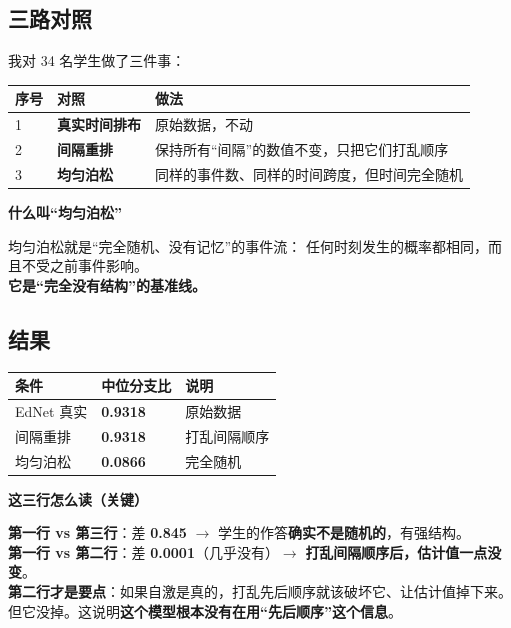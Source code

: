 \documentclass[UTF8,a4paper,11pt]{ctexart}
\newenvironment{explainbox}[1]
{\begin{center}\begin{minipage}{0.94\textwidth}\colorbox{boxbg}{\parbox{0.92\textwidth}{\textbf{#1}\par\vspace{2pt}}}}
{\end{minipage}\end{center}}
\newcommand{\hl}[1]{\textcolor{blue!70!black}{\textbf{#1}}}
\newcommand{\warn}[1]{\textcolor{red!70!black}{\textbf{#1}}}
\begin{document}
\subsection{三路对照}

我对 34 名学生做了三件事：

\begin{longtable}{@{}p{0.8cm}p{3.6cm}p{9.4cm}@{}}
\toprule
\textbf{序号} & \textbf{对照} & \textbf{做法} \\
\midrule
1 & \textbf{真实时间排布} & 原始数据，不动 \\
2 & \textbf{间隔重排} & 保持所有“间隔”的数值不变，只把它们打乱顺序 \\
3 & \textbf{均匀泊松} & 同样的事件数、同样的时间跨度，但时间完全随机 \\
\bottomrule
\end{longtable}

\begin{explainbox}{什么叫“均匀泊松”}
均匀泊松就是“完全随机、没有记忆”的事件流：
任何时刻发生的概率都相同，而且不受之前事件影响。\\
\textbf{它是“完全没有结构”的基准线。}
\end{explainbox}

\subsection{结果}

\begin{center}
\begin{tabular}{p{5.0cm}p{3.4cm}p{4.8cm}}
\toprule
\textbf{条件} & \textbf{中位分支比} & \textbf{说明} \\
\midrule
EdNet 真实 & \textbf{0.9318} & 原始数据 \\
间隔重排 & \textbf{0.9318} & 打乱间隔顺序 \\
均匀泊松 & \textbf{0.0866} & 完全随机 \\
\bottomrule
\end{tabular}
\end{center}

\begin{explainbox}{这三行怎么读（关键）}
\textbf{第一行 vs 第三行}：差 \hl{0.845} $\to$ 学生的作答\textbf{确实不是随机的}，有强结构。\\
\textbf{第一行 vs 第二行}：差 \hl{0.0001}（几乎没有）$\to$
\textbf{打乱间隔顺序后，估计值一点没变}。\\[4pt]
\textbf{第二行才是要点}：如果自激是真的，打乱先后顺序就该破坏它、让估计值掉下来。
但它没掉。这说明\warn{这个模型根本没有在用“先后顺序”这个信息}。
\end{explainbox}
\end{document}
